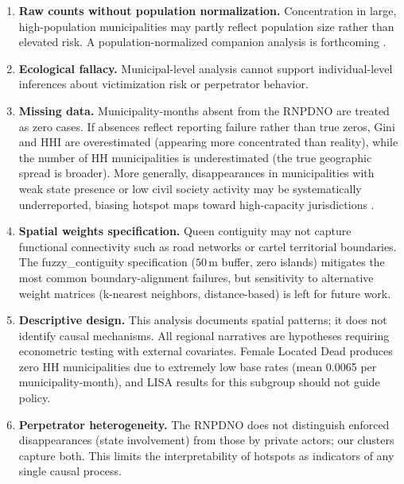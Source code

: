 \begin{enumerate}

  \item \textbf{Raw counts without population normalization.}
        Concentration in large, high-population municipalities may partly reflect population size rather than elevated risk.
        A population-normalized companion analysis is forthcoming \citep[cf.][]{andresen_2006}.

  \item \textbf{Ecological fallacy.}
        Municipal-level analysis cannot support individual-level inferences about victimization risk or perpetrator behavior.

  \item \textbf{Missing data.}
        Municipality-months absent from the RNPDNO are treated as zero cases.
        If absences reflect reporting failure rather than true zeros, Gini and HHI are overestimated (appearing more concentrated than reality), while the number of HH municipalities is underestimated (the true geographic spread is broader).
        More generally, disappearances in municipalities with weak state presence or low civil society activity may be systematically underreported, biasing hotspot maps toward high-capacity jurisdictions \citep{guercke_2021}.

  \item \textbf{Spatial weights specification.}
        Queen contiguity may not capture functional connectivity such as road networks or cartel territorial boundaries.
        The fuzzy\_contiguity specification ($50$\,m buffer, zero islands) mitigates the most common boundary-alignment failures, but sensitivity to alternative weight matrices (k-nearest neighbors, distance-based) is left for future work.

  \item \textbf{Descriptive design.}
        This analysis documents spatial patterns; it does not identify causal mechanisms.
        All regional narratives are hypotheses requiring econometric testing with external covariates.
        Female Located Dead produces zero HH municipalities due to extremely low base rates (mean 0.0065 per municipality-month), and LISA results for this subgroup should not guide policy.

  \item \textbf{Perpetrator heterogeneity.}
        The RNPDNO does not distinguish enforced disappearances (state involvement) from those by private actors; our clusters capture both.
        This limits the interpretability of hotspots as indicators of any single causal process.


\end{enumerate}
